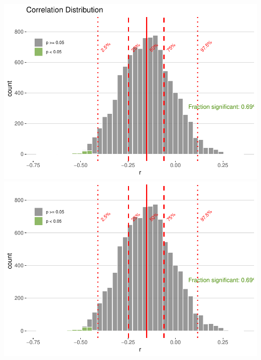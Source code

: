 \documentclass[gc, manuscript]{copernicus}
\begin{document}
\includegraphics{geoChronR-paper_files/figure-latex/cor-hist-1.pdf} \includegraphics{geoChronR-paper_files/figure-latex/cor-hist-2.pdf}
\end{document}
